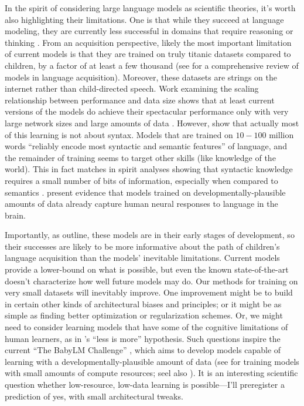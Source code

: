 \documentclass[output=paper,colorlinks,citecolor=brown
]{langscibook}
\begin{document}
In the spirit of considering large language models as scientific theories, it's worth also highlighting their limitations. One is that while they succeed at language modeling, they are currently less successful in domains that require reasoning or thinking \citep{mahowald2023dissociating,lake2021word,barrett2018measuring,collins2022structured}. From an acquisition perspective, likely the most important limitation of current models is that they are trained on truly titanic datasets compared to children, by a factor of at least a few thousand (see \cite{warstadt2022artificial} for a comprehensive review of models in language acquisition). Moreover, these datasets are strings on the internet rather than child-directed speech. Work examining the scaling relationship between performance and data size shows that at least current versions of the models do achieve their spectacular performance only with very large network sizes and large amounts of data \citep{kaplan2020scaling}. However, \cite{zhang2020you} show that actually most of this learning is not about syntax. Models that are trained on $10-100$ million words ``reliably encode most syntactic and semantic features'' of language, and the remainder of training seems to target other skills (like knowledge of the world). This in fact matches in spirit analyses showing that syntactic knowledge requires a small number of bits of information, especially when compared to semantics \citep{mollica2019humans}. \cite{hosseini2022artificial} present evidence that models trained on developmentally-plausible amounts of data already capture human neural responses to language in the brain. 

Importantly, as \cite{warstadt2022artificial} outline, these models are in their early stages of development, so their successes are likely to be more informative about the path of children's language acquisition than the models' inevitable limitations. Current models provide a lower-bound on what is possible, but even the known state-of-the-art doesn't characterize how well future models may do. Our methods for training on very small datasets will inevitably improve. One improvement might be to build in certain other kinds of architectural biases and principles; or it might be as simple as finding better optimization or regularization schemes. Or, we might need to consider learning models that have some of the cognitive limitations of human learners, as in \cite{newport1990maturational}'s ``less is more'' hypothesis. Such questions inspire the current ``The BabyLM Challenge'' \citep{warstadt2023call}, which aims to develop models capable of learning with a developmentally-plausible amount of data (see \cite{geiping2022cramming} for training models with small amounts of compute resources; seel also \cite{eldan2023tinystories}). It is an interesting scientific question whether low-resource, low-data learning is possible---I'll preregister a prediction of yes, with small architectural tweaks.
\end{document}
